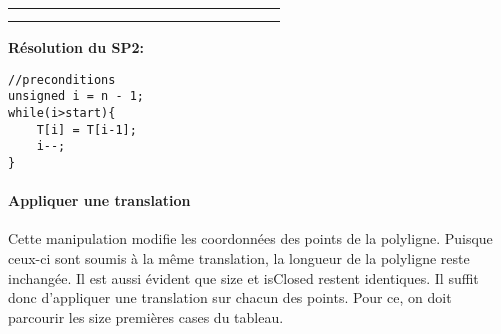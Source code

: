 \documentclass[a4paper, 11pt, oneside]{article}
\begin{document}
\begin{table}[h]
\begin{tabular}{|llcl|lllllllllllll|}
 &  & \multicolumn{1}{l}{} &  &  &  &  &  &  &  &  &  &  &  &  &  &  \\
 &  & \multicolumn{1}{l}{} &  &  &  &  &  &  &  &  &  &  &  &  &  &  \\ \hline
\end{tabular}
\end{table}

\noindent \textbf{Résolution du SP2:}
\begin{lstlisting}
//preconditions
unsigned i = n - 1;
while(i>start){
    T[i] = T[i-1];
    i--;
}
\end{lstlisting}

\paragraph{Appliquer une translation}\label{trans}
Cette manipulation modifie les coordonnées des points de la polyligne. Puisque ceux-ci sont soumis à la même translation, la longueur de la polyligne reste inchangée. Il est aussi évident que size et isClosed restent identiques. Il suffit donc d'appliquer une translation sur chacun des points. Pour ce, on doit parcourir les size premières cases du tableau.
\end{document}
